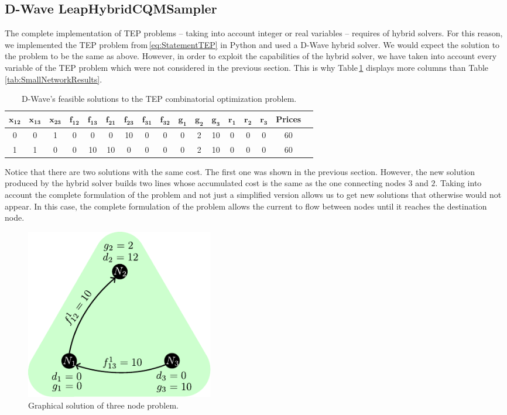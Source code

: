 \subsection{D-Wave LeapHybridCQMSampler}
The complete implementation of TEP problems -- taking into account integer or real variables -- requires of hybrid solvers. For this reason, we implemented the TEP problem from\,\eqref{eq:StatementTEP} in Python and used a D-Wave hybrid solver. We would expect the solution to the problem to be the same as above. However, in order to exploit the capabilities of the hybrid solver, we have taken into account every variable of the TEP problem which were not considered in the previous section. This is why Table\,\ref{tab:SmallNetworkResultsHybrid} displays more columns than Table\,\ref{tab:SmallNetworkResults}.
 \begin{table}[H]
\centering
\begin{tabular}{ |c|c|c|c|c|c|c|c|c|c|c|c|c|c|c|c|c| }
  \hline			
  $\mathbf{x_{12}}$ & $\mathbf{x_{13}}$ & $\mathbf{x_{23}}$ & $\mathbf{f_{12}}$ & $\mathbf{f_{13}}$ & $\mathbf{f_{21}}$ & $\mathbf{f_{23}}$ & $\mathbf{f_{31}}$ & $\mathbf{f_{32}}$ &$\mathbf{g_{1}}$ & $\mathbf{g_{2}}$ & $\mathbf{g_{3}}$ & $\mathbf{r_{1}}$ & $\mathbf{r_{2}}$ & $\mathbf{r_{3}}$ &  \textbf{Prices} \\
  \hline
    0 & 0 & 1 & 0 & 0 & 0 & 10 & 0 & 0 & 0 & 2 & 10 & 0 & 0 & 0 & 60 \\
  \hline
  1 & 1 & 0 & 0 & 10 & 10 & 0 & 0 & 0 & 0 & 2 & 10 & 0 & 0 & 0 & 60 \\
  \hline
\end{tabular}
\caption{D-Wave's feasible solutions to the TEP combinatorial optimization problem.}
\label{tab:SmallNetworkResultsHybrid}
\end{table}
Notice that there are two solutions with the same cost. The first one was shown in the previous section. However, the new solution produced by the hybrid solver builds two lines whose accumulated cost is the same as the one connecting nodes $3$ and $2$. Taking into account the complete formulation of the problem and not just a simplified version allows us to get new solutions that otherwise would not appear. In this case, the complete formulation of the problem allows the current to flow between nodes until it reaches the destination node.
\begin{figure}[H]
  \begin{center}
\includegraphics[width=0.4\textwidth]{Figures/3NodeGreenHybrid.pdf}
  \end{center}
  \caption{Graphical solution of three node problem.}
  \label{fig: Green_final_Hybrid}
\end{figure}
